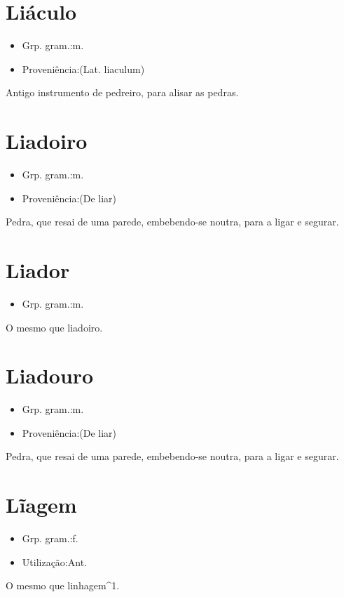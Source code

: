 \section{Liáculo}
\begin{itemize}
\item {Grp. gram.:m.}
\end{itemize}
\begin{itemize}
\item {Proveniência:(Lat. \textunderscore liaculum\textunderscore )}
\end{itemize}
Antigo instrumento de pedreiro, para alisar as pedras.
\section{Liadoiro}
\begin{itemize}
\item {Grp. gram.:m.}
\end{itemize}
\begin{itemize}
\item {Proveniência:(De \textunderscore liar\textunderscore )}
\end{itemize}
Pedra, que resai de uma parede, embebendo-se noutra, para a ligar e segurar.
\section{Liador}
\begin{itemize}
\item {Grp. gram.:m.}
\end{itemize}
O mesmo que \textunderscore liadoiro\textunderscore .
\section{Liadouro}
\begin{itemize}
\item {Grp. gram.:m.}
\end{itemize}
\begin{itemize}
\item {Proveniência:(De \textunderscore liar\textunderscore )}
\end{itemize}
Pedra, que resai de uma parede, embebendo-se noutra, para a ligar e segurar.
\section{Lĩagem}
\begin{itemize}
\item {Grp. gram.:f.}
\end{itemize}
\begin{itemize}
\item {Utilização:Ant.}
\end{itemize}
O mesmo que \textunderscore linhagem\textunderscore ^1.
